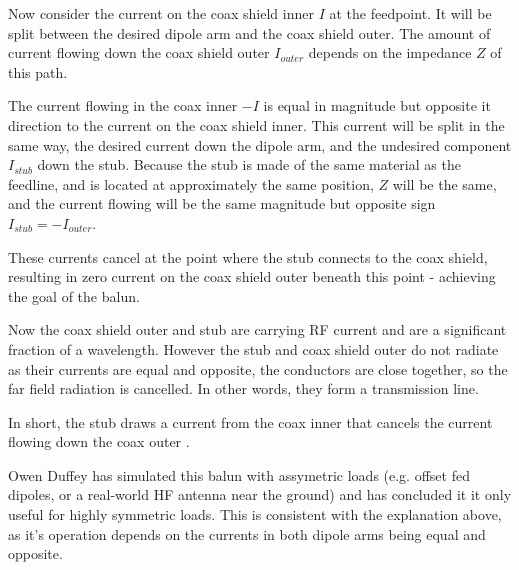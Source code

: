 \documentclass{article}
\begin{document}
Now consider the current on the coax shield inner $I$ at the feedpoint.  It will be split between the desired dipole arm and the coax shield outer. The amount of current flowing down the coax shield outer $I_{outer}$ depends on the impedance $Z$ of this path.

The current flowing in the coax inner $-I$ is equal in magnitude but opposite it direction to the current on the coax shield inner.  This current will be split in the same way, the desired current down the dipole arm, and the undesired component $I_{stub}$ down the stub.  Because the stub is made of the same material as the feedline, and is located at approximately the same position, $Z$ will be the same, and the current flowing will be the same magnitude but opposite sign $I_{stub}=-I_{outer}$.  

These currents cancel at the point where the stub connects to the coax shield, resulting in zero current on the coax shield outer beneath this point - achieving the goal of the balun.

Now the coax shield outer and stub are carrying RF current and are a significant fraction of a wavelength. However the stub and coax shield outer do not radiate as their currents are equal and opposite, the conductors are close together, so the far field radiation is cancelled.  In other words, they form a transmission line.

In short, the stub draws a current from the coax inner that cancels the current flowing down the coax outer \cite{antenna_theory}.

Owen Duffey \cite{duffey} has simulated this balun with assymetric loads (e.g. offset fed dipoles, or a real-world HF antenna near the ground) and has concluded it it only useful for highly symmetric loads.  This is consistent with the explanation above, as it's operation depends on the currents in both dipole arms being equal and opposite.



\end{document}

